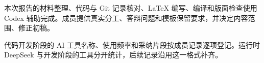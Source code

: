 本次报告的材料整理、代码与 Git 记录核对、LaTeX 编写、编译和版面检查使用 Codex 辅助完成。成员提供真实分工、答辩问题和模板保留要求，并决定内容范围、修正初稿。

代码开发阶段的 AI 工具名称、使用频率和采纳片段按成员记录逐项登记。运行时 DeepSeek 与开发阶段的工具分开统计，后续记录沿用这一格式补齐。
